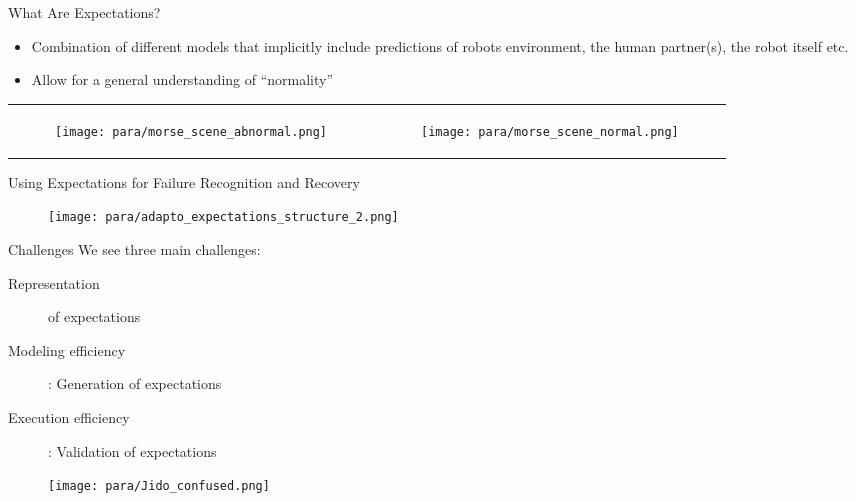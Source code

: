 \documentclass{beamer}
\begin{document}
\begin{frame}{What Are Expectations?}
\begin{itemize}
  \item Combination of different models that implicitly include predictions of robots environment, the human partner(s), the robot itself etc.
  \item Allow for a general understanding of ``normality'' 
\end{itemize}
 \begin{tabular}[h]{p{} p{}}
    \begin{figure}[h]
    \texttt{[image: para/morse\_scene\_abnormal.png]}
  \end{figure} &
   \begin{figure}[h]
    \texttt{[image: para/morse\_scene\_normal.png]} 
  \end{figure}\\
  \end{tabular}
\end{frame}

\begin{frame}{Using Expectations for Failure Recognition and Recovery}
 \begin{figure}[h]
    \texttt{[image: para/adapto\_expectations\_structure\_2.png]} 
  \end{figure}
\end{frame}

\begin{frame}{Challenges}
We see three main challenges:
 \begin{description}
\item [Representation] of expectations
\item [Modeling efficiency]: Generation of expectations
\item [Execution efficiency]: Validation of expectations
\end{description} 
 \begin{figure}[h]
        \texttt{[image: para/Jido\_confused.png]} \\
  \end{figure}
\end{frame}
\end{document}
